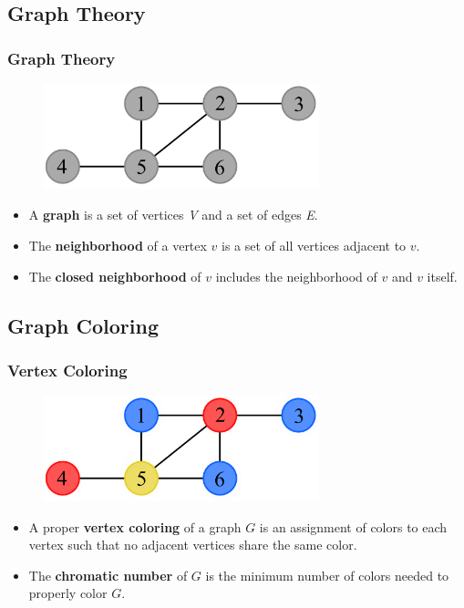 \documentclass[xcolor=dvipsnames,aspectratio=1610]{beamer}
\begin{document}
  \subsection*{Graph Theory}

  \begin{frame}
    \frametitle{Graph Theory}

    \begin{figure}[h]
      \centering
      \includegraphics[width=8cm]{../figures/example.pdf}
    \end{figure}

    \vfill

    \begin{itemize}
      \item A \textbf{graph} is a set of vertices \emph{V} and a set of edges \emph{E}.
      \item The \textbf{neighborhood} of a vertex $v$ is a set of all vertices adjacent to $v$.
      \item The \textbf{closed neighborhood} of $v$ includes the neighborhood of $v$ and $v$ itself.
    \end{itemize}
  \end{frame}

  \subsection*{Graph Coloring}

  \begin{frame}
    \frametitle{Vertex Coloring}

    \begin{figure}[h]
      \centering
      \includegraphics[width=8cm]{../figures/example-vcp.pdf}
    \end{figure}

    \vfill

    \begin{itemize}
      \item A proper \textbf{vertex coloring} of a graph $G$ is an assignment of colors to each vertex such that no adjacent vertices share the same color.
      \item The \textbf{chromatic number} of $G$ is the minimum number of colors needed to properly color $G$.
    \end{itemize}
  \end{frame}
\end{document}
